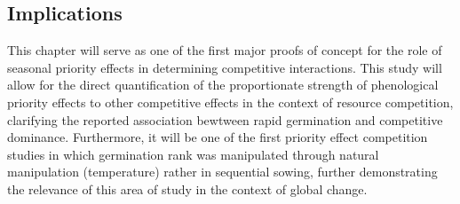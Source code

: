 \documentclass[12pt]{article}\usepackage[]{graphicx}\usepackage[]{color}
\begin{document}
\subsection*{Implications}
\indent\indent This chapter will serve as one of the first major proofs of concept for the role of seasonal priority effects in determining competitive interactions. This study will allow for the direct quantification of the proportionate strength of phenological priority effects to other competitive effects in the context of resource competition, clarifying the reported association bewtween rapid germination and competitive dominance. Furthermore, it will be one of the first priority effect competition studies in which germination rank was manipulated through natural manipulation (temperature) rather in sequential sowing, further demonstrating the relevance of this area of study in the context of global change.
\end{document}
